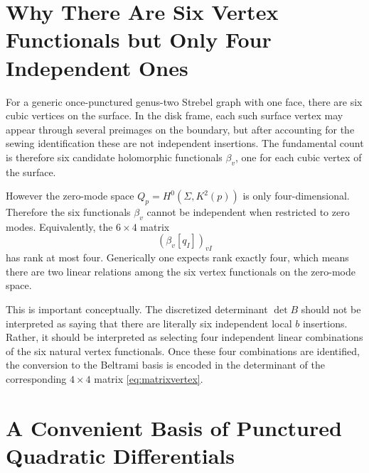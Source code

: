\documentclass[12pt]{article}
\begin{document}
\section{Why There Are Six Vertex Functionals but Only Four Independent Ones}

For a generic once-punctured genus-two Strebel graph with one face, there are six cubic vertices on the surface. In the disk frame, each such surface vertex may appear through several preimages on the boundary, but after accounting for the sewing identification these are not independent insertions. The fundamental count is therefore six candidate holomorphic functionals $\beta_v$, one for each cubic vertex of the surface.

However the zero-mode space $Q_p=H^0(\Sigma,K^2(p))$ is only four-dimensional. Therefore the six functionals $\beta_v$ cannot be independent when restricted to zero modes. Equivalently, the $6\times 4$ matrix
\begin{equation}
(\beta_v[q_I])_{vI}
\end{equation}
has rank at most four. Generically one expects rank exactly four, which means there are two linear relations among the six vertex functionals on the zero-mode space.

This is important conceptually. The discretized determinant $\det B$ should not be interpreted as saying that there are literally six independent local $b$ insertions. Rather, it should be interpreted as selecting four independent linear combinations of the six natural vertex functionals. Once these four combinations are identified, the conversion to the Beltrami basis is encoded in the determinant of the corresponding $4\times 4$ matrix \eqref{eq:matrixvertex}.

\section{A Convenient Basis of Punctured Quadratic Differentials}
\end{document}
